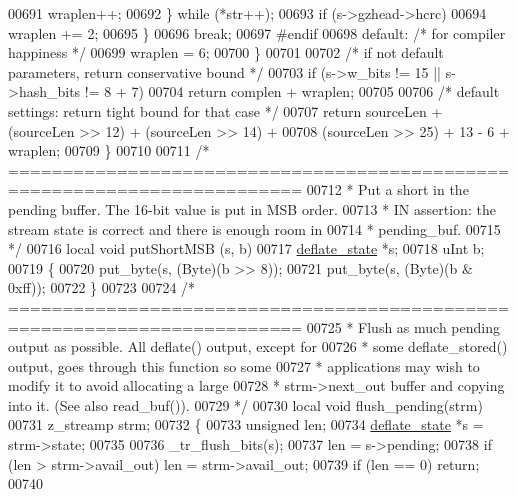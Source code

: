 \begin{DoxyCode}
{00691                     wraplen++;
00692                 \} \textcolor{keywordflow}{while} (*str++);
00693             \textcolor{keywordflow}{if} (s->gzhead->hcrc)
00694                 wraplen += 2;
00695         \}
00696         \textcolor{keywordflow}{break};
00697 \textcolor{preprocessor}{#endif}
00698     \textcolor{keywordflow}{default}:                                \textcolor{comment}{/* for compiler happiness */}
00699         wraplen = 6;
00700     \}
00701 
00702     \textcolor{comment}{/* if not default parameters, return conservative bound */}
00703     \textcolor{keywordflow}{if} (s->w\_bits != 15 || s->hash\_bits != 8 + 7)
00704         \textcolor{keywordflow}{return} complen + wraplen;
00705 
00706     \textcolor{comment}{/* default settings: return tight bound for that case */}
00707     \textcolor{keywordflow}{return} sourceLen + (sourceLen >> 12) + (sourceLen >> 14) +
00708            (sourceLen >> 25) + 13 - 6 + wraplen;
00709 \}
00710 
00711 \textcolor{comment}{/* =========================================================================}
00712 \textcolor{comment}{ * Put a short in the pending buffer. The 16-bit value is put in MSB order.}
00713 \textcolor{comment}{ * IN assertion: the stream state is correct and there is enough room in}
00714 \textcolor{comment}{ * pending\_buf.}
00715 \textcolor{comment}{ */}
00716 local \textcolor{keywordtype}{void} putShortMSB (s, b)
00717     \hyperlink{structinternal__state}{deflate\_state} *s;
00718     uInt b;
00719 \{
00720     put\_byte(s, (Byte)(b >> 8));
00721     put\_byte(s, (Byte)(b & 0xff));
00722 \}
00723 
00724 \textcolor{comment}{/* =========================================================================}
00725 \textcolor{comment}{ * Flush as much pending output as possible. All deflate() output, except for}
00726 \textcolor{comment}{ * some deflate\_stored() output, goes through this function so some}
00727 \textcolor{comment}{ * applications may wish to modify it to avoid allocating a large}
00728 \textcolor{comment}{ * strm->next\_out buffer and copying into it. (See also read\_buf()).}
00729 \textcolor{comment}{ */}
00730 local \textcolor{keywordtype}{void} flush\_pending(strm)
00731     z\_streamp strm;
00732 \{
00733     \textcolor{keywordtype}{unsigned} len;
00734     \hyperlink{structinternal__state}{deflate\_state} *s = strm->state;
00735 
00736     \_tr\_flush\_bits(s);
00737     len = s->pending;
00738     \textcolor{keywordflow}{if} (len > strm->avail\_out) len = strm->avail\_out;
00739     \textcolor{keywordflow}{if} (len == 0) \textcolor{keywordflow}{return};
00740 
}
\end{DoxyCode}
